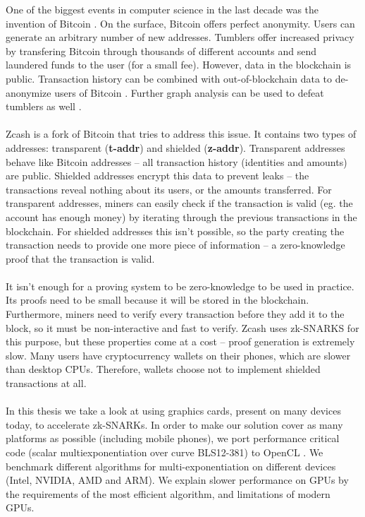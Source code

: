 One of the biggest events in computer science in the last decade was the invention of Bitcoin \cite{nakamoto2008bitcoin}. On the surface, Bitcoin offers perfect anonymity. Users can generate an arbitrary number of new addresses. Tumblers offer increased privacy by transfering Bitcoin through thousands of different accounts and send laundered funds to the user (for a small fee). However, data in the blockchain is public. Transaction history can be combined with out-of-blockchain data to de-anonymize users of Bitcoin \cite{biryukov2014deanonymisation}. Further graph analysis can be used to defeat tumblers as well \cite{de2017analysis}.\\
\\
Zcash \cite{zcashprotocol} is a fork of Bitcoin that tries to address this issue. It contains two types of addresses: transparent (\textbf{t-addr}) and shielded (\textbf{z-addr}). Transparent addresses behave like Bitcoin addresses -- all transaction history (identities and amounts) are public. Shielded addresses encrypt this data to prevent leaks -- the transactions reveal nothing about its users, or the amounts transferred. For transparent addresses, miners can easily check if the transaction is valid (eg. the account has enough money) by iterating through the previous transactions in the blockchain. For shielded addresses this isn't possible, so the party creating the transaction needs to provide one more piece of information -- a zero-knowledge proof that the transaction is valid. \\
\\
It isn't enough for a proving system to be zero-knowledge to be used in practice. Its proofs need to be small because it will be stored in the blockchain. Furthermore, miners need to verify every transaction before they add it to the block, so it must be non-interactive and fast to verify. Zcash uses zk-SNARKS for this purpose, but these properties come at a cost -- proof generation is extremely slow. Many users have cryptocurrency wallets on their phones, which are slower than desktop CPUs. Therefore, wallets choose not to implement shielded transactions at all.\\
\\
In this thesis we take a look at using graphics cards, present on many devices today, to accelerate zk-SNARKs. In order to make our solution cover as many platforms as possible (including mobile phones), we port performance critical code (scalar multiexponentiation over curve BLS12-381) to OpenCL \cite{stone2010opencl}. We benchmark different algorithms for multi-exponentiation on different devices (Intel, NVIDIA, AMD and ARM). We explain slower performance on GPUs by the requirements of the most efficient algorithm, and limitations of modern GPUs.\\
